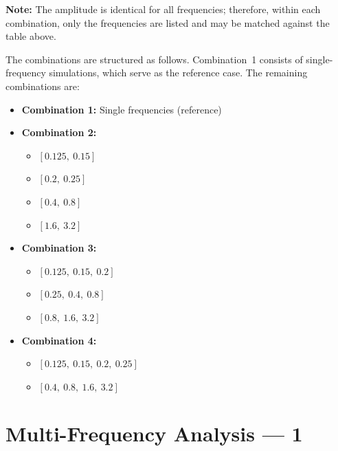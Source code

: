 \documentclass[a4paper, 12pt]{report}
\begin{document}
\textbf{Note:} The amplitude is identical for all frequencies; therefore, within each combination, 
only the frequencies are listed and may be matched against the table above.

The combinations are structured as follows. Combination~1 consists of single-frequency simulations, 
which serve as the reference case. The remaining combinations are:

\begin{itemize}
    \item \textbf{Combination 1:} Single frequencies (reference)

    \item \textbf{Combination 2:}
    \begin{itemize}
        \item $[0.125,\ 0.15]$
        \item $[0.2,\ 0.25]$
        \item $[0.4,\ 0.8]$
        \item $[1.6,\ 3.2]$
    \end{itemize}

    \item \textbf{Combination 3:}
    \begin{itemize}
        \item $[0.125,\ 0.15,\ 0.2]$
        \item $[0.25,\ 0.4,\ 0.8]$
        \item $[0.8,\ 1.6,\ 3.2]$
    \end{itemize}

    \item \textbf{Combination 4:}
    \begin{itemize}
        \item $[0.125,\ 0.15,\ 0.2,\ 0.25]$
        \item $[0.4,\ 0.8,\ 1.6,\ 3.2]$
    \end{itemize}
\end{itemize}

\section{Multi-Frequency Analysis --- 1}

\end{document}
